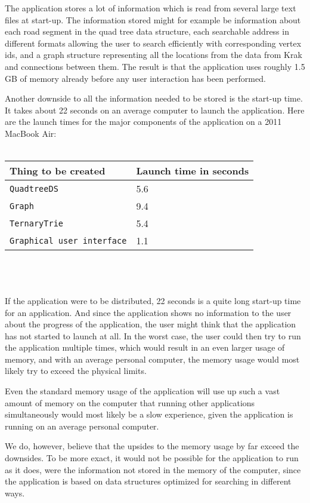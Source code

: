 The application stores a lot of information which is read from several large text files at start-up. The information stored might for example be information about each road segment in the quad tree data structure, each searchable address in different formats allowing the user to search efficiently with corresponding vertex ids, and a graph structure representing all the locations from the data from Krak and connections between them. The result is that the application uses roughly 1.5 GB of memory already before any user interaction has been performed.

Another downside to all the information needed to be stored is the start-up time. It takes about 22 seconds on an average computer to launch the application. Here are the launch times for the major components of the application on a 2011 MacBook Air: \\ \\
\begin{tabular}{ p{5cm} | p{5cm} }
	\textbf{Thing to be created} & \textbf{Launch time in seconds} \\
	\hline
	\texttt{QuadtreeDS} & 5.6 \\
	\texttt{Graph} & 9.4 \\
	\texttt{TernaryTrie} & 5.4 \\
	\texttt{Graphical user interface} & 1.1
\end{tabular}
\\ \\ \\
If the application were to be distributed, 22 seconds is a quite long start-up time for an application. And since the application shows no information to the user about the progress of the application, the user might think that the application has not started to launch at all. In the worst case, the user could then try to run the application multiple times, which would result in an even larger usage of memory, and with an average personal computer, the memory usage would most likely try to exceed the physical limits.

Even the standard memory usage of the application will use up such a vast amount of memory on the computer that running other applications simultaneously would most likely be a slow experience, given the application is running on an average personal computer.

We do, however, believe that the upsides to the memory usage by far exceed the downsides. To be more exact, it would not be possible for the application to run as it does, were the information not stored in the memory of the computer, since the application is based on data structures optimized for searching in different ways.


